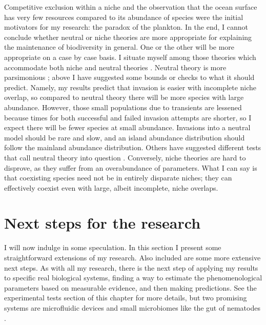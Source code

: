 Competitive exclusion within a niche and the observation that the ocean surface has very few resources compared to its abundance of species were the initial motivators for my research: the paradox of the plankton. 
In the end, I cannot conclude whether neutral or niche theories are more appropriate for explaining the maintenance of biodiversity in general. 
One or the other will be more appropriate on a case by case basis. 
I situate myself among those theories which accommodate both niche and neutral theories \cite{Leibold2006,Ofiteru2010,Pigolotti2013,Fisher2014,Kessler2015}. 
Neutral theory is more parsimonious \cite{Leibold2006}; above I have suggested some bounds or checks to what it should predict. 
Namely, my results predict that invasion is easier with incomplete niche overlap, so compared to neutral theory there will be more species with large abundance. 
However, those small populations due to transients are lessened because times for both successful and failed invasion attempts are shorter, so I expect there will be fewer species at small abundance. 
Invasions into a neutral model should be rare and slow, and an island abundance distribution should follow the mainland abundance distribution. %
Others have suggested different tests that call neutral theory into question \cite{McGill2003,Ricklefs2006,Kelly2008,Adler2010,Rosindell2011,Carroll2015}. 
Conversely, niche theories are hard to disprove, as they suffer from an overabundance of parameters. 
What I can say is that coexisting species need not be in entirely disparate niches; they can effectively coexist even with large, albeit incomplete, niche overlaps. 



\section{Next steps for the research}
I will now indulge in some speculation. 
In this section I present some straightforward extensions of my research. 
Also included are some more extensive next steps. 
As with all my research, there is the next step of applying my results to specific real biological systems, finding a way to estimate the phenomenological parameters based on measurable evidence, and then making predictions. 
See the experimental tests section of this chapter for more details, but two promising systems are microfluidic devices \cite{Groisman2005} and small microbiomes like the gut of nematodes \cite{Vega2017}. 

